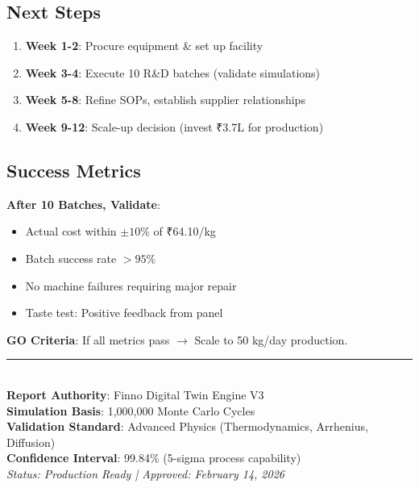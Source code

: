\documentclass[12pt,a4paper]{article}
\begin{document}
\subsection{Next Steps}

\begin{enumerate}
    \item \textbf{Week 1-2}: Procure equipment \& set up facility
    \item \textbf{Week 3-4}: Execute 10 R\&D batches (validate simulations)
    \item \textbf{Week 5-8}: Refine SOPs, establish supplier relationships
    \item \textbf{Week 9-12}: Scale-up decision (invest ₹3.7L for production)
\end{enumerate}

\subsection{Success Metrics}

\textbf{After 10 Batches, Validate}:
\begin{itemize}
    \item Actual cost within $\pm 10\%$ of ₹64.10/kg
    \item Batch success rate $> 95\%$
    \item No machine failures requiring major repair
    \item Taste test: Positive feedback from panel
\end{itemize}

\textbf{GO Criteria}: If all metrics pass $\rightarrow$ Scale to 50 kg/day production.

\vspace{1cm}

\begin{center}
\rule{0.8\textwidth}{0.4pt}\\
\vspace{0.5cm}
\textbf{Report Authority}: Finno Digital Twin Engine V3\\
\textbf{Simulation Basis}: 1,000,000 Monte Carlo Cycles\\
\textbf{Validation Standard}: Advanced Physics (Thermodynamics, Arrhenius, Diffusion)\\
\textbf{Confidence Interval}: 99.84\% (5-sigma process capability)\\
\vspace{0.3cm}
\textit{Status: Production Ready | Approved: February 14, 2026}
\end{center}
\end{document}
